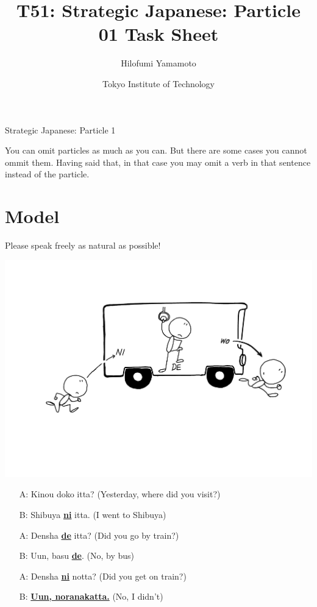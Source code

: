 \documentclass[uplatex,a4paper]{jsarticle}
\title{T51: Strategic Japanese: Particle 01 Task Sheet}
\author{Hilofumi Yamamoto}
\date{Tokyo Institute of Technology}
\begin{document}
\thispagestyle{fancy}

{\noindent\LARGE Strategic Japanese: Particle 1}

\vspace*{.5\baselineskip}


You can omit particles as much as you can.
But there are some cases you cannot ommit them.
Having said that, in that case you may omit a verb in that sentence instead of the particle.

\section{Model}

Please speak freely as natural as possible! 

\begin{flushright}
\includegraphics[trim=100 170 70 100, clip, width=.45\hsize]{2019-06-01.pdf}
\end{flushright}

\vspace*{-8\baselineskip}

\begin{itemize}
   \item[A:] Kinou doko itta? (Yesterday, where did you visit?) 
   \item[B:] Shibuya \underline{{\bfseries ni}} itta. (I went to Shibuya)
   \item[A:] Densha \underline{{\bfseries de}} itta? (Did you go by train?)
   \item[B:] Uun, basu \underline{{\bfseries de}}. (No, by bus)
   \item[A:] Densha \underline{{\bfseries ni}} notta? (Did you get on train?) 
   \item[B:] \underline{{\bfseries Uun, noranakatta.}} (No, I didn't)
\end{itemize}
\end{document}
